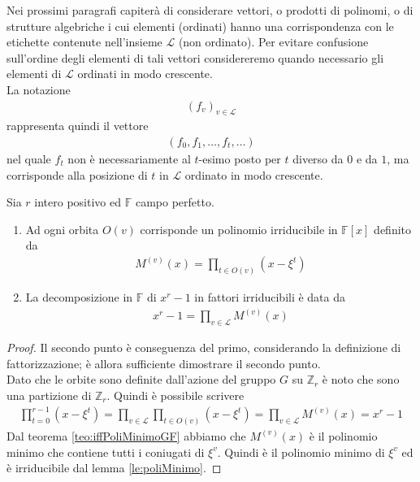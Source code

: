 Nei prossimi paragrafi capiterà di considerare vettori, o prodotti di polinomi, o di strutture algebriche i cui elementi (ordinati) hanno una corrispondenza con le etichette contenute nell'insieme $\mathscr{L}$ (non ordinato). Per evitare confusione sull'ordine degli elementi di tali vettori considereremo quando necessario gli elementi di $\mathscr{L}$ ordinati in modo crescente.\\
La notazione
\begin{align*}
   (f_{v})_{v \in \mathscr{L}}
\end{align*}
rappresenta quindi il vettore
\begin{align*}
   (f_{0},f_{1}, \dots , f_{t}, \dots)
\end{align*}
nel quale $f_{t}$ non è necessariamente al $t$-esimo posto per $t$ diverso da $0$ e da $1$, ma corrisponde alla posizione di $t$ in $\mathscr{L}$ ordinato in modo crescente.

\begin{teorema}
   Sia $r$ intero positivo ed $\mathbb{F}$ campo perfetto.
   \begin{enumerate}
      \item Ad ogni orbita $O(v)$ corrisponde un polinomio irriducibile in $\mathbb{F}[x]$ definito da
            \begin{align*}
               M^{(v)}(x) =  \prod_{t \in O(v)} (x- \xi^t)
            \end{align*}
      \item La decomposizione in $\mathbb{F}$ di $x^r - 1$ in fattori irriducibili è data da
            \begin{align*}
               x^r - 1 = \prod_{v \in \mathscr{L} } M^{(v)}(x)
            \end{align*}
   \end{enumerate}
\end{teorema}
\begin{proof}
Il secondo punto è conseguenza del primo, considerando la definizione di fattorizzazione; è allora sufficiente dimostrare il secondo punto.\\
Dato che le orbite sono definite dall'azione del gruppo $G$ su $\mathbb{Z}_{r}$ è noto che sono una partizione di $\mathbb{Z}_{r}$.
Quindi è possibile scrivere
\begin{align*}
   \prod_{t= 0}^{r-1} (x - \xi^{t})
   = \prod_{v \in \mathscr{L} } \prod_{t \in O(v)} (x - \xi^{t})
   = \prod_{v \in \mathscr{L} } M^{(v)}(x)
   =  x^r - 1
\end{align*}
Dal teorema \ref{teo:iffPoliMinimoGF} abbiamo che $M^{(v)}(x)$ è il polinomio minimo che contiene tutti i coniugati di $\xi^{v}$. Quindi è il polinomio minimo di $\xi^{v}$ ed è irriducibile dal lemma \ref{le:poliMinimo}.
\end{proof}

